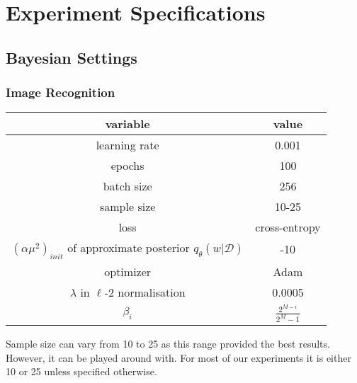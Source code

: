 \chapter{Experiment Specifications} 

\section*{Bayesian Settings}

\subsection{Image Recognition}

\begin{table}[h!]
    \centering
    \renewcommand{\arraystretch}{2}
    \begin{tabular}[c]{c | c} 
     \hline
     variable & value \\ [0.5ex] 
     \hline
     learning rate &  0.001\\ 
     
     epochs & 100 \\
     
     batch size & 256 \\
     
     sample size & 10-25 \\
     
     loss & cross-entropy \\
     
     $(\alpha \mu^2)_{init}$ of approximate posterior $q_{\theta}(w|\mathcal{D})$ & -10 \\
     
     optimizer & Adam \cite{kingma2014adam} \\
     
     $\lambda$ in $\ell$-2 normalisation & 0.0005 \\
    
     $\beta_i$ & $\frac{2^{M-i}}{2^M-1}$ \cite{blundell2015weight} \\ [1ex] 
     \hline
    \end{tabular} 
    \renewcommand{\arraystretch}{2}
\end{table}

Sample size can vary from 10 to 25 as this range provided the best results. However, it can be played around with. For most of our experiments it is either 10 or 25 unless specified otherwise. 


